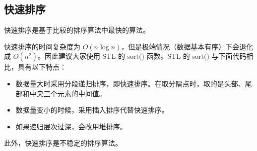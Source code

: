 \subsection{快速排序}
	快速排序是基于比较的排序算法中最快的算法。
	
	
	
	快速排序的时间复杂度为 $O(n\log n)$，但是极端情况（数据基本有序）下会退化成 $O(n^2)$。因此建议大家使用 STL 的 sort() 函数。STL 的 sort() 与下面代码相比，具有以下特点：
	
	\begin{itemize}
		\item 数据量大时采用分段递归排序，即快速排序。在取分隔点时，取的是头部、尾部和中央三个元素的中间值。
		\item 数据量变小的时候，采用插入排序代替快速排序。
		\item 如果递归层次过深，会改用堆排序。
	\end{itemize}

	此外，快速排序是不稳定的排序算法。
